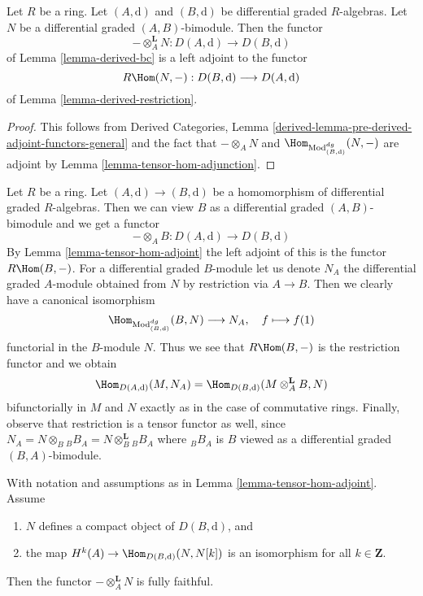 \begin{lemma}
\label{lemma-tensor-hom-adjoint}
Let $R$ be a ring.
Let $(A, \text{d})$ and $(B, \text{d})$ be differential graded $R$-algebras.
Let $N$ be a differential graded $(A, B)$-bimodule.
Then the functor
$$
- \otimes_A^\mathbf{L} N : D(A, \text{d}) \longrightarrow D(B, \text{d})
$$
of Lemma \ref{lemma-derived-bc} is a left adjoint to the functor
$$
R\Hom(N, -) : D(B, \text{d}) \longrightarrow D(A, \text{d})
$$
of Lemma \ref{lemma-derived-restriction}.
\end{lemma}

\begin{proof}
This follows from Derived Categories, Lemma
\ref{derived-lemma-pre-derived-adjoint-functors-general}
and the fact that $- \otimes_A N$ and
$\Hom_{\text{Mod}^{dg}_{(B, \text{d})}}(N, -)$ are adjoint by
Lemma \ref{lemma-tensor-hom-adjunction}.
\end{proof}

\begin{example}
\label{example-map-hom-tensor}
Let $R$ be a ring. Let $(A, \text{d}) \to (B, \text{d})$ be a
homomorphism of differential graded $R$-algebras. Then we can
view $B$ as a differential graded $(A, B)$-bimodule and we get a functor
$$
- \otimes_A B : D(A, \text{d}) \longrightarrow D(B, \text{d})
$$
By Lemma \ref{lemma-tensor-hom-adjoint} the left adjoint of this
is the functor $R\Hom(B, -)$. For a differential graded $B$-module
let us denote $N_A$ the differential graded $A$-module obtained
from $N$ by restriction via $A \to B$. Then we clearly have
a canonical isomorphism
$$
\Hom_{\text{Mod}^{dg}_{(B, \text{d})}}(B, N) \longrightarrow N_A,\quad
f \longmapsto f(1)
$$
functorial in the $B$-module $N$. Thus we see that
$R\Hom(B, -)$ is the restriction functor and we obtain
$$
\Hom_{D(A, \text{d})}(M, N_A) =
\Hom_{D(B, \text{d})}(M \otimes^\mathbf{L}_A B, N)
$$
bifunctorially in $M$ and $N$ exactly as in the case of commutative rings.
Finally, observe that restriction is a tensor functor as well,
since $N_A = N \otimes_B {}_BB_A = N \otimes_B^\mathbf{L} {}_BB_A$
where ${}_BB_A$ is $B$ viewed as a differential graded $(B, A)$-bimodule.
\end{example}

\begin{lemma}
\label{lemma-tensor-with-compact-fully-faithful}
With notation and assumptions as in Lemma \ref{lemma-tensor-hom-adjoint}.
Assume
\begin{enumerate}
\item $N$ defines a compact object of $D(B, \text{d})$, and
\item the map $H^k(A) \to \Hom_{D(B, \text{d})}(N, N[k])$ is an
isomorphism for all $k \in \mathbf{Z}$.
\end{enumerate}
Then the functor $-\otimes_A^\mathbf{L} N$ is fully faithful.
\end{lemma}

